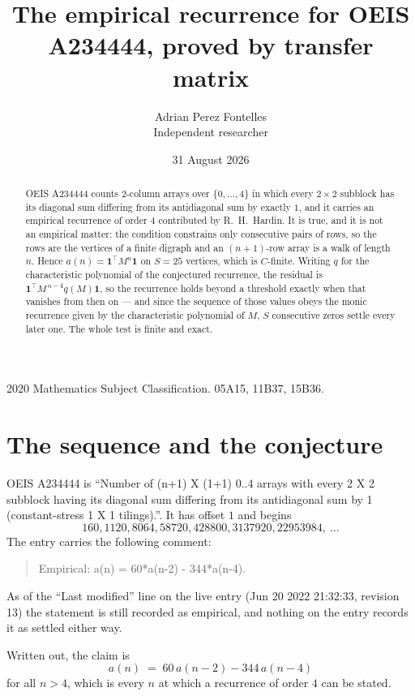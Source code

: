 \documentclass[11pt,a4paper]{article}
\title{The empirical recurrence for OEIS A234444, proved by transfer matrix}
\author{Adrian Perez Fontelles\\ \small Independent researcher}
\date{31 August 2026}
\theoremstyle{plain}
\theoremstyle{definition}
\begin{document}
\maketitle

\begin{abstract}
OEIS A234444 counts $2$-column arrays over $\{0,\dots,4\}$ in which every
$2\times2$ subblock has its diagonal sum differing from its antidiagonal sum by
exactly $1$, and it
carries an empirical recurrence of order $4$ contributed by R.~H.~Hardin. It is true,
and it is not an empirical matter: the condition constrains only consecutive pairs of rows,
so the rows are the vertices of a finite digraph and an $(n+1)$-row array is a walk of
length $n$. Hence $a(n)=\mathbf{1}^{\!\top}M^{n}\mathbf{1}$ on $S=25$ vertices, which
is $C$-finite. Writing $q$ for the characteristic polynomial of the conjectured recurrence,
the residual is $\mathbf{1}^{\!\top}M^{\,n-4}q(M)\mathbf{1}$, so the recurrence
holds beyond a threshold exactly when that vanishes from then on --- and since the sequence
of those values obeys the monic recurrence given by the characteristic polynomial of $M$,
$S$ consecutive zeros settle every later one. The whole test is finite and exact.
\end{abstract}

\noindent\small 2020 Mathematics Subject Classification. 05A15, 11B37, 15B36.\normalsize

\section{The sequence and the conjecture}

OEIS A234444 is ``Number of (n+1) X (1+1) 0..4 arrays with every 2 X 2 subblock having its diagonal sum differing from its antidiagonal sum by 1 (constant-stress 1 X 1 tilings).''. It has offset
$1$ and begins
\[
160, 1120, 8064, 58720, 428800, 3137920, 22953984,\ \dots
\]
The entry carries the following comment:
\begin{quote}\small
Empirical: a(n) = 60*a(n-2) - 344*a(n-4).
\end{quote}
As of the ``Last modified'' line on the live entry (Jun 20 2022 21:32:33, revision 13) the statement is
still recorded as empirical, and nothing on the entry records it as settled either way.

Written out, the claim is
\begin{equation}\label{eq:conj}
a(n)\;=\;60\,a(n-2) - 344\,a(n-4)
\end{equation}
for all $n>4$, which is every $n$ at which a recurrence of order $4$ can be
stated.
\end{document}
